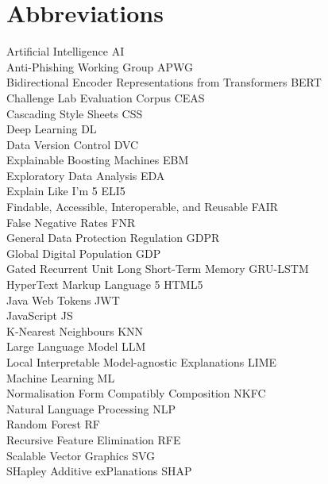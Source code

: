 
\section*{Abbreviations}

\large
Artificial Intelligence \hfill AI\\
Anti-Phishing Working Group \hfill APWG\\
Bidirectional Encoder Representations from Transformers \hfill BERT\\
Challenge Lab Evaluation Corpus \hfill CEAS\\
Cascading Style Sheets \hfill CSS\\
Deep Learning \hfill DL\\
Data Version Control \hfill DVC\\
Explainable Boosting Machines \hfill EBM\\
Exploratory Data Analysis \hfill EDA\\
Explain Like I'm 5 \hfill ELI5\\
Findable, Accessible, Interoperable, and Reusable \hfill FAIR \\
False Negative Rates \hfill FNR\\
General Data Protection Regulation \hfill GDPR\\
Global Digital Population \hfill GDP\\
Gated Recurrent Unit Long Short-Term Memory \hfill GRU-LSTM\\
HyperText Markup Language 5 \hfill HTML5\\
Java Web Tokens \hfill JWT\\
JavaScript \hfill JS\\
K-Nearest Neighbours \hfill KNN\\
Large Language Model \hfill LLM\\
Local Interpretable Model-agnostic Explanations \hfill LIME\\
Machine Learning \hfill ML\\
Normalisation Form Compatibly Composition \hfill NKFC\\
Natural Language Processing \hfill NLP\\
Random Forest \hfill RF\\
Recursive Feature Elimination \hfill RFE\\
Scalable Vector Graphics \hfill SVG\\
SHapley Additive exPlanations \hfill SHAP\\
